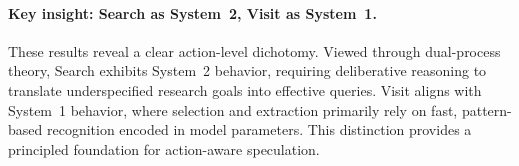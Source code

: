 \paragraph{Key insight: Search as System~2, Visit as System~1.}
These results reveal a clear action-level dichotomy. Viewed through dual-process theory, Search exhibits System~2 behavior, requiring deliberative reasoning to translate underspecified research goals into effective queries. Visit aligns with System~1 behavior, where selection and extraction primarily rely on fast, pattern-based recognition encoded in model parameters. This distinction provides a principled foundation for action-aware speculation.





